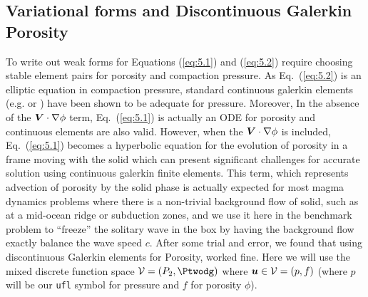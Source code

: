 \subsection{Variational forms and Discontinuous Galerkin Porosity}
\label{sec:variational-forms}

To write out weak forms for Equations (\ref{eq:5.1}) and
(\ref{eq:5.2}) require choosing stable element pairs for porosity and
compaction pressure.  As Eq.\ (\ref{eq:5.2}) is an elliptic equation
in compaction pressure, standard continuous galerkin elements (e.g. \Pone
or \Ptwo) have been shown to be adequate for pressure.  Moreover, In the
absence of the ${\mbox{\boldmath$V$}}\cdot\nabla\phi$ term, Eq.\ (\ref{eq:5.1}) is
actually an ODE for porosity and continuous elements are also valid.
However, when the ${\mbox{\boldmath$V$}}\cdot\nabla\phi$ is included, Eq.\ (\ref{eq:5.1})
becomes a hyperbolic equation for the evolution of porosity in a frame
moving with the solid which can present significant challenges for
accurate solution using continuous galerkin finite elements.  This term, which
represents advection of porosity by the solid phase is actually
expected for most magma dynamics problems where there is a non-trivial
background flow of solid, such as at a mid-ocean ridge or subduction
zones, and we use it here in the benchmark problem to ``freeze'' the
solitary wave in the box by having the background flow exactly balance
the wave speed $c$.  After some trial and error, we found that using
discontinuous Galerkin elements for Porosity, worked fine.  Here we
will use the mixed discrete function space $\fspace=(\Ptwo,\Ptwodg)$
where ${\mbox{\boldmath$u$}}\in\mathcal{V}=(p,f)$ (where $p$ will be our  \texttt{ufl}
symbol for pressure and $f$ for porosity $\phi$).

